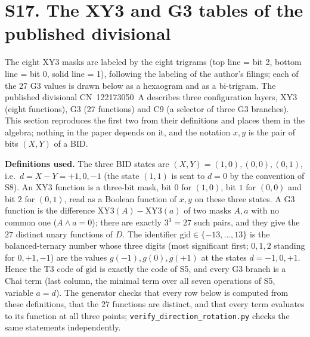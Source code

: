 \documentclass[10pt,a4paper]{article}
\newcommand{\D}{D}\newcommand{\Z}{\mathcal Z}\newcommand{\SYN}{\mathsf{SYN}}\newcommand{\DIF}{\mathsf{DIF}}\newcommand{\OR}{\mathsf{OR}}\newcommand{\XOR}{\mathsf{XOR}}\newcommand{\AND}{\mathsf{AND}}\newcommand{\NOT}{\mathsf{NOT}}\newcommand{\ANT}{\mathsf{ANT}}\newcommand{\MAX}{\mathsf{MAX}}\newcommand{\MIN}{\mathsf{MIN}}\newcommand{\MAG}{\mathsf{MAG}}\newcommand{\chai}{Chai}\newcommand{\Fone}{\mathcal F_1}\newcommand{\Ftwo}{\mathcal F_2}\usepackage{tikz}\usetikzlibrary{arrows.meta,positioning}\newcommand{\yang}{\rule{0.8em}{0.18ex}}\newcommand{\yin}{\rule{0.25em}{0.18ex}\hspace{0.3em}\rule{0.25em}{0.18ex}}\newcommand{\tri}[3]{\raisebox{-0.01ex}{\shortstack[c]{#1\\[-0.3ex]#2\\[-0.3ex]#3}}}\newcommand{\iv}[1]{[\![#1]\!]}
\begin{document}
\section*{S17. The XY3 and G3 tables of the published divisional}
The eight XY3 masks are labeled by the eight trigrams (top line = bit 2, bottom line = bit 0, solid line = 1), following the labeling of the author's filings; each of the 27 G3 values is drawn below as a hexaogram and as a bi-trigram. The published divisional CN~122173050~A describes three configuration layers, XY3 (eight functions), G3 (27 functions) and C9 (a selector of three G3 branches). This section reproduces the first two from their definitions and places them in the algebra; nothing in the paper depends on it, and the notation $x,y$ is the pair of bits $(X,Y)$ of a BID.

\textbf{Definitions used.} The three BID states are $(X,Y)=(1,0),(0,0),(0,1)$, i.e.\ $d=X-Y=+1,0,-1$ (the state $(1,1)$ is sent to $d=0$ by the convention of S8). An XY3 function is a three-bit mask, bit $0$ for $(1,0)$, bit $1$ for $(0,0)$ and bit $2$ for $(0,1)$, read as a Boolean function of $x,y$ on these three states. A G3 function is the difference $\mathrm{XY3}(A)-\mathrm{XY3}(a)$ of two masks $A,a$ with no common one ($A\wedge a=0$); there are exactly $3^3=27$ such pairs, and they give the $27$ distinct unary functions of $\D$. The identifier $\mathrm{gid}\in\{-13,\dots,13\}$ is the balanced-ternary number whose three digits (most significant first; $0,1,2$ standing for $0,+1,-1$) are the values $g(-1),g(0),g(+1)$ at the states $d=-1,0,+1$. Hence the T3 code of $\mathrm{gid}$ is exactly the code of S5, and every G3 branch is a \chai{} term (last column, the minimal term over all seven operations of S5, variable $a=d$). The generator checks that every row below is computed from these definitions, that the $27$ functions are distinct, and that every term evaluates to its function at all three points; \texttt{verify\_direction\_rotation.py} checks the same statements independently.
\end{document}
